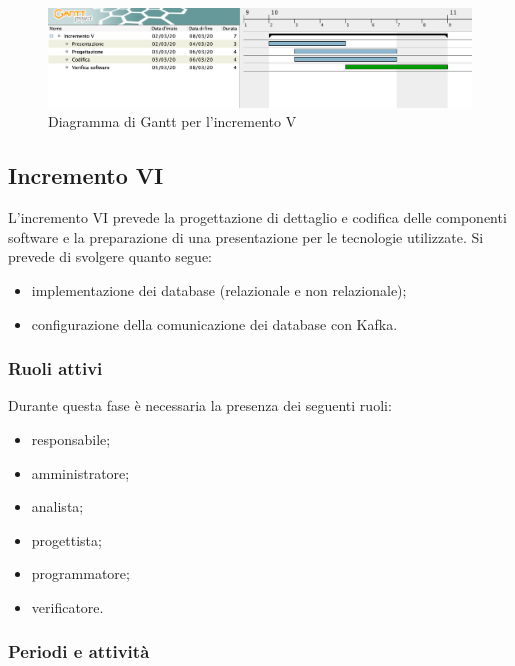 		\begin{landscape}
          \begin{figure}[H]
            \centering
            \includegraphics[width=\linewidth]{images/gantt/incrementoV} %
            \caption{Diagramma di Gantt per l'incremento V}
          \end{figure}		
		\end{landscape}


		\subsection{Incremento VI}
			
			L'incremento VI prevede la progettazione di dettaglio e codifica delle componenti software e la preparazione di una presentazione per le tecnologie utilizzate. Si prevede di svolgere quanto segue:
			\begin{itemize}
				\item implementazione dei database (relazionale e non relazionale);
				\item configurazione della comunicazione dei database con Kafka.
			\end{itemize}
			
			\subsubsection{Ruoli attivi}
			
				Durante questa fase è necessaria la presenza dei seguenti ruoli:
				\begin{itemize}
					\item responsabile;
					\item amministratore;
					\item analista;
					\item progettista;
					\item programmatore;
					\item verificatore.
				\end{itemize}
			
			\subsubsection{Periodi e attività}
			
